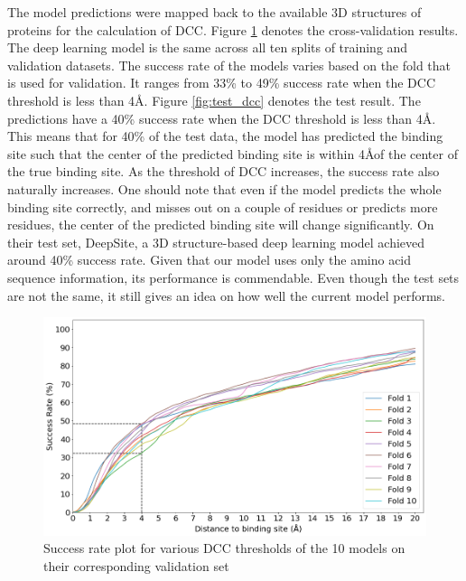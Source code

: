 \documentclass[journal=jacsat,manuscript=article]{achemso}
\begin{document}
The model predictions were mapped back to the available 3D structures of proteins for the calculation of DCC. Figure \ref{fig:valid_dcc} denotes the cross-validation results. The deep learning model is the same across all ten splits of training and validation datasets. The success rate of the models varies based on the fold that is used for validation. It ranges from 33\% to 49\% success rate when the DCC threshold is less than 4\AA. Figure \ref{fig:test_dcc} denotes the test result. The predictions have a 40\% success rate when the DCC threshold is less than 4\AA. This means that for 40\% of the test data, the model has predicted the binding site such that the center of the predicted binding site is within 4\AA of the center of the true binding site. As the threshold of DCC increases, the success rate also naturally increases. One should note that even if the model predicts the whole binding site correctly, and misses out on a couple of residues or predicts more residues, the center of the predicted binding site will change significantly. On their test set, DeepSite, a 3D structure-based deep learning model \cite{jimenez2017deepsite} achieved around 40\% success rate. Given that our model uses only the amino acid sequence information, its performance is commendable. Even though the test sets are not the same, it still gives an idea on how well the current model performs.

\vspace{10 mm}
\begin{figure}
    \centering
    \noindent\includegraphics[scale=0.45]{valid_dcc.png}
    \caption{\centering Success rate plot for various DCC thresholds of the 10 models on their corresponding validation set}
    \label{fig:valid_dcc}
\end{figure}
\end{document}

